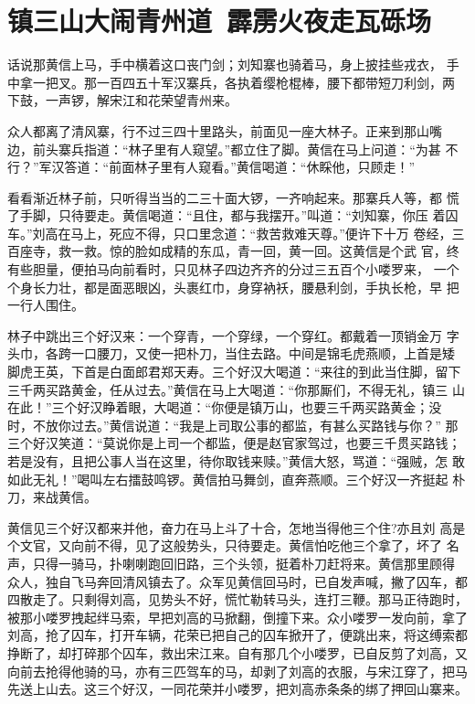 \chapter{镇三山大闹青州道~霹雳火夜走瓦砾场}

话说那黄信上马，手中横着这口丧门剑；刘知寨也骑着马，身上披挂些戎衣，
手中拿一把叉。那一百四五十军汉寨兵，各执着缨枪棍棒，腰下都带短刀利剑，两
下鼓，一声锣，解宋江和花荣望青州来。

众人都离了清风寨，行不过三四十里路头，前面见一座大林子。正来到那山嘴
边，前头寨兵指道：“林子里有人窥望。”都立住了脚。黄信在马上问道：“为甚
不行？”军汉答道：“前面林子里有人窥看。”黄信喝道：“休睬他，只顾走！”

看看渐近林子前，只听得当当的二三十面大锣，一齐响起来。那寨兵人等，都
慌了手脚，只待要走。黄信喝道：“且住，都与我摆开。”叫道：“刘知寨，你压
着囚车。”刘高在马上，死应不得，只口里念道：“救苦救难天尊。”便许下十万
卷经，三百座寺，救一救。惊的脸如成精的东瓜，青一回，黄一回。这黄信是个武
官，终有些胆量，便拍马向前看时，只见林子四边齐齐的分过三五百个小喽罗来，
一个个身长力壮，都是面恶眼凶，头裹红巾，身穿衲袄，腰悬利剑，手执长枪，早
把一行人围住。

林子中跳出三个好汉来：一个穿青，一个穿绿，一个穿红。都戴着一顶销金万
字头巾，各跨一口腰刀，又使一把朴刀，当住去路。中间是锦毛虎燕顺，上首是矮
脚虎王英，下首是白面郎君郑天寿。三个好汉大喝道：“来往的到此当住脚，留下
三千两买路黄金，任从过去。”黄信在马上大喝道：“你那厮们，不得无礼，镇三
山在此！”三个好汉睁着眼，大喝道：“你便是镇万山，也要三千两买路黄金；没
时，不放你过去。”黄信说道：“我是上司取公事的都监，有甚么买路钱与你？”
那三个好汉笑道：“莫说你是上司一个都监，便是赵官家驾过，也要三千贯买路钱；
若是没有，且把公事人当在这里，待你取钱来赎。”黄信大怒，骂道：“强贼，怎
敢如此无礼！”喝叫左右擂鼓鸣锣。黄信拍马舞剑，直奔燕顺。三个好汉一齐挺起
朴刀，来战黄信。

黄信见三个好汉都来并他，奋力在马上斗了十合，怎地当得他三个住?亦且刘
高是个文官，又向前不得，见了这般势头，只待要走。黄信怕吃他三个拿了，坏了
名声，只得一骑马，扑喇喇跑回旧路，三个头领，挺着朴刀赶将来。黄信那里顾得
众人，独自飞马奔回清风镇去了。众军见黄信回马时，已自发声喊，撇了囚车，都
四散走了。只剩得刘高，见势头不好，慌忙勒转马头，连打三鞭。那马正待跑时，
被那小喽罗拽起绊马索，早把刘高的马掀翻，倒撞下来。众小喽罗一发向前，拿了
刘高，抢了囚车，打开车辆，花荣已把自己的囚车掀开了，便跳出来，将这缚索都
挣断了，却打碎那个囚车，救出宋江来。自有那几个小喽罗，已自反剪了刘高，又
向前去抢得他骑的马，亦有三匹驾车的马，却剥了刘高的衣服，与宋江穿了，把马
先送上山去。这三个好汉，一同花荣并小喽罗，把刘高赤条条的绑了押回山寨来。


